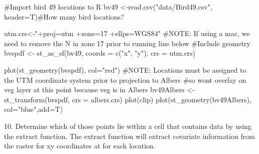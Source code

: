 \documentclass[
  letterpaper,
]{book}
\newenvironment{Shaded}{\begin{snugshade}}{\end{snugshade}}
\newcommand{\AttributeTok}[1]{\textcolor[rgb]{0.40,0.45,0.13}{#1}}
\newcommand{\CommentTok}[1]{\textcolor[rgb]{0.37,0.37,0.37}{#1}}
\newcommand{\FunctionTok}[1]{\textcolor[rgb]{0.28,0.35,0.67}{#1}}
\newcommand{\NormalTok}[1]{\textcolor[rgb]{0.00,0.23,0.31}{#1}}
\newcommand{\OtherTok}[1]{\textcolor[rgb]{0.00,0.23,0.31}{#1}}
\newcommand{\SpecialCharTok}[1]{\textcolor[rgb]{0.37,0.37,0.37}{#1}}
\newcommand{\StringTok}[1]{\textcolor[rgb]{0.13,0.47,0.30}{#1}}
\begin{document}
\begin{Shaded}
\begin{Highlighting}[]
\CommentTok{\#Import bird 49 locations to R}
\NormalTok{bv49 }\OtherTok{\textless{}{-}}\FunctionTok{read.csv}\NormalTok{(}\StringTok{"data/Bird49.csv"}\NormalTok{, }\AttributeTok{header=}\NormalTok{T)}\CommentTok{\#How many bird locations?}

\NormalTok{utm.crs}\OtherTok{\textless{}{-}}\StringTok{"+proj=utm +zone=17 +ellps=WGS84"} \CommentTok{\#NOTE: If using a mac, we need to remove the N in zone 17 prior to running line below}
\CommentTok{\#Include geometry}
\NormalTok{bvspdf }\OtherTok{\textless{}{-}} \FunctionTok{st\_as\_sf}\NormalTok{(bv49, }\AttributeTok{coords =} \FunctionTok{c}\NormalTok{(}\StringTok{"x"}\NormalTok{, }\StringTok{"y"}\NormalTok{), }\AttributeTok{crs =}\NormalTok{ utm.crs)}

\FunctionTok{plot}\NormalTok{(}\FunctionTok{st\_geometry}\NormalTok{(bvspdf), }\AttributeTok{col=}\StringTok{"red"}\NormalTok{)}
\CommentTok{\#NOTE: Locations must be assigned to the UTM coordinate system prior to projection to Albers }
\CommentTok{\#so won\textquotesingle{}t overlay on veg layer at this point because veg is in Albers}
\NormalTok{bv49Albers }\OtherTok{\textless{}{-}} \FunctionTok{st\_transform}\NormalTok{(bvspdf, }\AttributeTok{crs =}\NormalTok{ albers.crs)}
\FunctionTok{plot}\NormalTok{(clip)}
\FunctionTok{plot}\NormalTok{(}\FunctionTok{st\_geometry}\NormalTok{(bv49Albers), }\AttributeTok{col=}\StringTok{"blue"}\NormalTok{,}\AttributeTok{add=}\NormalTok{T)}
\end{Highlighting}
\end{Shaded}

10. Determine which of those points lie within a cell that contains data
by using the extract function. The extract function will extract
covariate information from the raster for xy coordinates at for each
location.

\begin{Shaded}
\end{Shaded}
\end{document}
